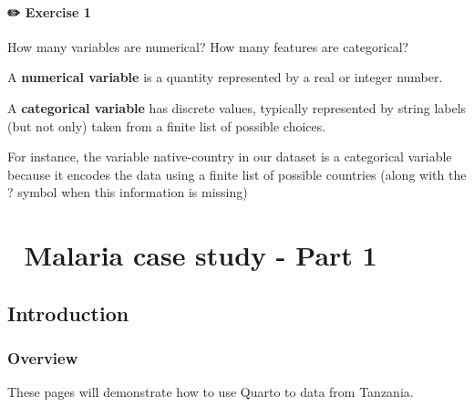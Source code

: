 \documentclass[
  letterpaper,
  DIV=11,
  numbers=noendperiod,
  oneside]{scrreprt}
\begin{document}
\subsubsection{\texorpdfstring{{✏️} Exercise 1}{✏️ Exercise 1}}

How many variables are numerical? How many features are categorical?

\begin{tcolorbox}[enhanced jigsaw, coltitle=black, opacityback=0, title=\textcolor{quarto-callout-note-color}{\faInfo}\hspace{0.5em}{Note}, toprule=.15mm, bottomtitle=1mm, colbacktitle=quarto-callout-note-color!10!white, colframe=quarto-callout-note-color-frame, left=2mm, opacitybacktitle=0.6, bottomrule=.15mm, arc=.35mm, toptitle=1mm, colback=white, titlerule=0mm, breakable, leftrule=.75mm, rightrule=.15mm]

A \textbf{numerical variable} is a quantity represented by a real or
integer number.

A \textbf{categorical variable} has discrete values, typically
represented by string labels (but not only) taken from a finite list of
possible choices.

\end{tcolorbox}

For instance, the variable native-country in our dataset is a
categorical variable because it encodes the data using a finite list of
possible countries (along with the ? symbol when this information is
missing)

\hypertarget{malaria-case-study---part-1}{%
\chapter{\texorpdfstring{{📙} Malaria case study - Part
1}{📙 Malaria case study - Part 1}}\label{malaria-case-study---part-1}}

\hypertarget{introduction-11}{%
\section{Introduction}\label{introduction-11}}

\hypertarget{overview-7}{%
\subsection{Overview}\label{overview-7}}

These pages will demonstrate how to use Quarto to data from Tanzania.
\end{document}

